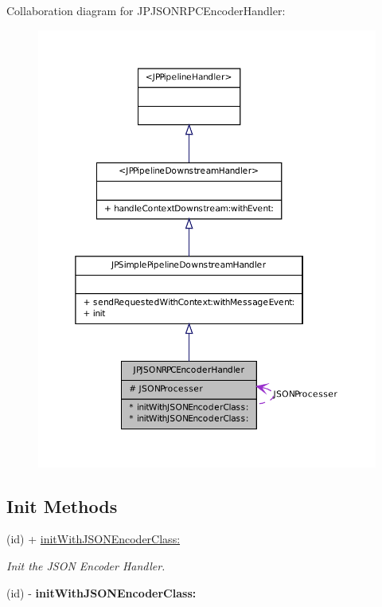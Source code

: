 Collaboration diagram for JPJSONRPCEncoderHandler:\nopagebreak
\begin{figure}[H]
\begin{center}
\leavevmode
\includegraphics[width=360pt]{a00110}
\end{center}
\end{figure}
\subsection*{Init Methods}
\begin{DoxyCompactItemize}
\item 
(id) + \hyperlink{a00016_ac232419eba6d5ad305b0412e92945dab}{initWithJSONEncoderClass:}
\begin{DoxyCompactList}\small\item\em Init the JSON Encoder Handler. \item\end{DoxyCompactList}\item 
\hypertarget{a00016_ac232419eba6d5ad305b0412e92945dab}{
(id) -\/ {\bfseries initWithJSONEncoderClass:}}
\label{a00016_ac232419eba6d5ad305b0412e92945dab}

\end{DoxyCompactItemize}



